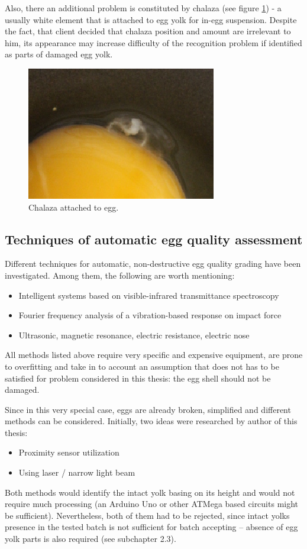 \documentclass[12pt,twoside,a4paper]{article}
\begin{document}
Also, there an additional problem is constituted by chalaza (see figure \ref{fig:chalaza}) - a usually white element that is attached to egg yolk for in-egg suspension.
Despite the fact, that client decided that chalaza position and amount are irrelevant to him, its appearance may increase difficulty of the recognition problem if identified as parts of damaged egg yolk.

 
\begin{figure}[H]
\centering
\includegraphics[width=0.4\paperwidth]{chalaza}
\caption{Chalaza attached to egg.}\label{fig:chalaza}
\end{figure}


\subsection{Techniques of automatic egg quality assessment}

Different techniques for automatic, non-destructive egg quality grading have been investigated.
Among them, the following are worth mentioning:
\begin{itemize}
\item Intelligent systems based on visible-infrared transmittance spectroscopy\cite{agri}
\item Fourier frequency analysis of a vibration-based response on impact force\cite{svm} 
\item Ultrasonic, magnetic resonance, electric resistance, electric nose\cite{nondestr}  
\end{itemize}
All methods listed above require very specific and expensive equipment, are prone to overfitting and take in to account an assumption that does not has to be satisfied for problem considered in this thesis: the egg shell should not be damaged.

Since in this very special case, eggs are already broken, simplified and different methods can be considered.
Initially, two ideas were researched by author of this thesis:
\begin{itemize}
\item Proximity sensor utilization
\item Using laser / narrow light beam 
\end{itemize}
Both methods would identify the intact yolk basing on its height and would not require much processing (an Arduino Uno or other ATMega based circuits might be sufficient).
Nevertheless, both of them had to be rejected, since intact yolks presence in the tested batch is not sufficient for batch accepting – absence of egg yolk parts is also required (see subchapter 2.3).
\end{document}
